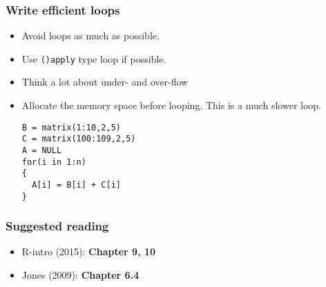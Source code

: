 \documentclass[10pt]{beamer}
\begin{document}
\begin{frame}[fragile]
  \frametitle{Write efficient loops}

  \begin{itemize}
  \item Avoid loops as much as possible.
  \item Use \texttt{()apply} type loop if possible.
  \item Think a lot about under- and over-flow
  \item Allocate the memory space before looping. This is a much
    slower loop.
\begin{verbatim}
B = matrix(1:10,2,5)
C = matrix(100:109,2,5)
A = NULL
for(i in 1:n)
{
  A[i] = B[i] + C[i]
}
\end{verbatim}

  \end{itemize}

\end{frame}




\begin{frame}
  \frametitle{Suggested reading}

  \begin{itemize}
  \item R-intro (2015): \textbf{Chapter 9, 10}
  \item Jones (2009): \textbf{Chapter 6.4}
  \end{itemize}

\end{frame}
\end{document}
